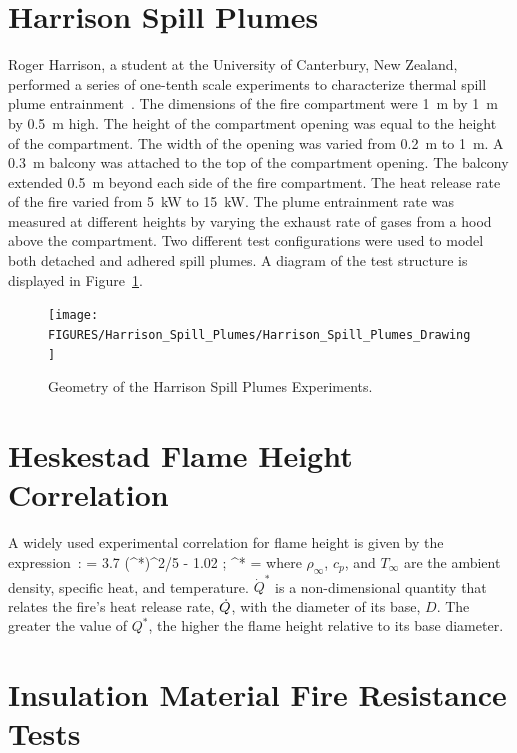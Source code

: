 \section{Harrison Spill Plumes}
\label{Harrison_Spill_Plumes_Description}

Roger Harrison, a student at the University of Canterbury, New Zealand, performed a series of one-tenth scale experiments to characterize thermal spill plume entrainment~\cite{Harrison:2009,Harrison:IAFSS2008,Harrison:FT2007,Harrison:FSJ2010}. The dimensions of the fire compartment were 1~m by 1~m by 0.5~m high.  The height of the compartment opening was equal to the height of the compartment. The width of the opening was varied from 0.2~m to 1~m.  A 0.3~m balcony was attached to the top of the compartment opening. The balcony extended 0.5~m beyond each side of the fire compartment.  The heat release rate of the fire varied from 5~kW to 15~kW.
The plume entrainment rate was measured at different heights by varying the exhaust rate of gases from a hood above the compartment.
Two different test configurations were used to model both detached and adhered spill plumes. A diagram of the test structure is displayed in Figure~\ref{Harrison_Drawing}.

\begin{figure}[p]
\texttt{[image: FIGURES/Harrison\_Spill\_Plumes/Harrison\_Spill\_Plumes\_Drawing]}
\caption{Geometry of the Harrison Spill Plumes Experiments.}
\label{Harrison_Drawing}
\end{figure}




\section{Heskestad Flame Height Correlation}
\label{Heskestad_Flame_Height_Description}

A widely used experimental correlation for flame height is given by the expression~\cite{Heskestad:FSJ1983,SFPE:Heskestad}:
\be
    = 3.7 \; (^*)^{2/5} - 1.02  \quad ; \quad {}^* = 
\ee
where $\rho_\infty$, $c_p$, and $T_\infty$ are the ambient density, specific heat, and temperature. $\dot{Q}^*$ is a non-dimensional quantity that relates the fire's heat release rate, $\dot{Q}$, with the diameter of its base, $D$. The greater the value of $Q^*$, the higher the flame height relative to its base diameter.

\section{Insulation Material Fire Resistance Tests}
\label{Insulation_Materials_Description}

